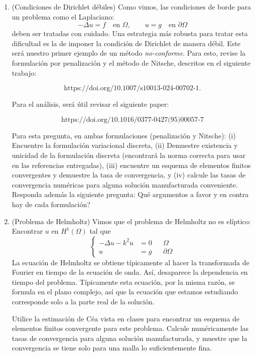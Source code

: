 \documentclass{article}
\begin{document}
\begin{enumerate}
    \item (Condiciones de Dirichlet débiles) Como vimos, las condiciones de borde para un problema como el Laplaciano: 
        $$ -\Delta u = f \quad\text{en $\Omega$}, \qquad u=g\quad\text{en $\partial\Omega$} $$
    deben ser tratadas con cuidado. Una estrategia más robusta para tratar esta dificultad es la de imponer la condición de Dirichlet de manera débil. Este será nuestro primer ejemplo de un método \emph{no-conforme}. Para esto, revise la formulación por penalización y el método de Nitsche, descritos en el siguiente trabajo: 

    $$ \text{https://doi.org/10.1007/s10013-024-00702-1}. $$
   
    Para el análisis, será útil revisar el siguiente paper: 

    $$ \text{https://doi.org/10.1016/0377-0427(95)00057-7} $$

    Para esta pregunta, en ambas formulaciones (penalización y Nitsche): (i) Encuentre la formulación variacional discreta, (ii) Demuestre existencia y unicidad de la formulación discreta (encontrará la norma correcta para usar en las referencias entregadas), (iii) encuentre un esquema de elementos finitos convergentes y demuestre la tasa de convergencia, y (iv) calcule las tasas de convergencia numéricas para alguna solución manufacturada conveniente. Responda además la siguiente pregunta: Qué argumentos a favor y en contra hay de cada formulación? 

    \item (Problema de Helmholtz) Vimos que el problema de Helmholtz no es elíptico: Encontrar $u$ en $H^1(\Omega)$ tal que 
        $$
        \left\{\begin{aligned}
             -\Delta u - k^2 u&= 0 &&\Omega \\
            u &= g &&\partial\Omega
        \end{aligned}\right.
        $$
        La ecuación de Helmholtz se obtiene típicamente al hacer la transformada de Fourier en tiempo de la ecuación de onda. Así, desaparece la dependencia en tiempo del problema. Típicamente esta ecuación, por la misma razón, se formula en el plano complejo, así que la ecuación que estamos estudiando corresponde solo a la parte real de la solución. 

        Utilice la estimación de Céa vista en clases para encontrar un esquema de elementos finitos convergente para este problema. Calcule numéricamente las tasas de convergencia para alguna solución manufacturada, y muestre que la convergencia se tiene solo para una malla lo suficientemente fina. 
        


\end{enumerate}
\end{document}
